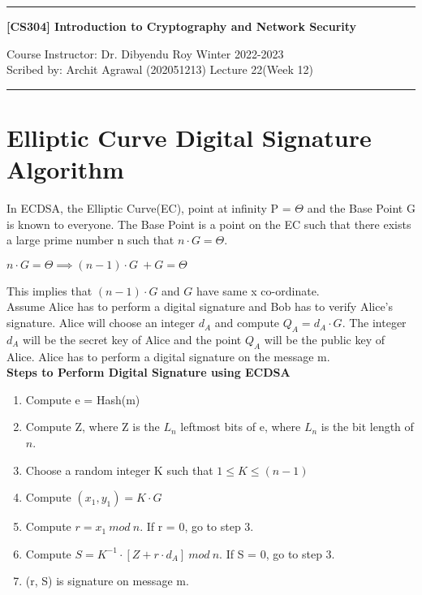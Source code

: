 \documentclass[11pt]{article}
\begin{document}
\noindent
\rule{\textwidth}{1pt}
\begin{center}
{\bf [CS304] Introduction to Cryptography and Network Security}
\end{center}
Course Instructor: Dr. Dibyendu Roy \hfill Winter 2022-2023\\
Scribed by: Archit Agrawal (202051213) \hfill Lecture 22(Week 12)
\\
\rule{\textwidth}{1pt}

\section{Elliptic Curve Digital Signature Algorithm}
In ECDSA, the Elliptic Curve(EC), point at infinity P = $\Theta$ and the Base Point G is known to everyone. The Base Point is a point on the EC such that there exists a large prime number n such that $n\cdot G = \Theta$.
\begin{center}
    $n \cdot G = \Theta \implies (n-1) \cdot G \ \boxed{+} G = \Theta$
\end{center}
This implies that $(n-1)\cdot G$ and $G$ have same x co-ordinate.\\
\newline
Assume Alice has to perform a digital signature and Bob has to verify Alice's signature. Alice will choose an integer $d_A$ and compute $Q_A = d_A\cdot G$. The integer $d_A$ will be the secret key of Alice and the point $Q_A$ will be the public key of Alice. Alice has to perform a digital signature on the message m.\\
\newline
\textbf{Steps to Perform Digital Signature using ECDSA}
\begin{enumerate}
    \item Compute e = Hash(m)
    \item Compute Z, where Z is the $L_n$ leftmost bits of e, where $L_n$ is the bit length of $n$.
    \item Choose a random integer K such that $1 \leq K \leq (n - 1)$
    \item Compute $(x_1, y_1) = K \cdot G$
    \item Compute $r = x_1 \ mod \ n$. If r = 0, go to step 3.
    \item Compute $S = K^{-1} \cdot [Z + r \cdot d_A] \ mod \ n$. If S = 0, go to step 3.
    \item (r, S) is signature on message m.
\end{enumerate}
\end{document}
